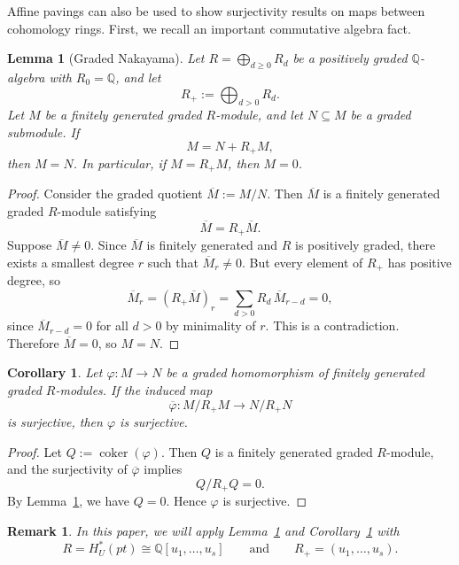 \documentclass[11pt]{amsart}
\numberwithin{equation}{section}
\newtheorem{corollary}[theorem]{Corollary}
\newtheorem{lemma}[theorem]{Lemma}
\newtheorem{remark}[theorem]{Remark}
\theoremstyle{definition}
\newcommand{\QQ}{{\mathbb{Q}}}
\begin{document}
Affine pavings can also be used to show surjectivity results on maps between
cohomology rings. First, we recall an important commutative algebra fact.

\begin{lemma}[Graded Nakayama]\label{lem: graded-nakayama}
    Let $R = \bigoplus_{d \geq 0} R_d$ be a positively graded $\QQ$-algebra
    with $R_0 = \QQ$, and let
    \[
        R_+ := \bigoplus_{d > 0} R_d.
    \]
    Let $M$ be a finitely generated graded $R$-module, and let
    $N \subseteq M$ be a graded submodule. If
    \[
        M = N + R_+M,
    \]
    then $M = N$. In particular, if $M = R_+M$, then $M = 0$.
\end{lemma}

\begin{proof}
    Consider the graded quotient $\overline{M} := M/N$. Then $\overline{M}$ is
    a finitely generated graded $R$-module satisfying
    \[
        \overline{M} = R_+\overline{M}.
    \]
    Suppose $\overline{M} \neq 0$. Since $\overline{M}$ is finitely generated
    and $R$ is positively graded, there exists a smallest degree $r$ such that
    $\overline{M}_r \neq 0$. But every element of $R_+$ has positive degree, so
    \[
        \overline{M}_r = (R_+\overline{M})_r
        = \sum_{d>0} R_d\,\overline{M}_{r-d} = 0,
    \]
    since $\overline{M}_{r-d} = 0$ for all $d>0$ by minimality of $r$.
    This is a contradiction. Therefore $\overline{M} = 0$, so $M = N$.
\end{proof}

\begin{corollary}\label{cor: graded-nakayama-surj}
    Let $\varphi: M \to N$ be a graded homomorphism of finitely generated
    graded $R$-modules. If the induced map
    \[
        \overline{\varphi}: M/R_+M \longrightarrow N/R_+N
    \]
    is surjective, then $\varphi$ is surjective.
\end{corollary}

\begin{proof}
    Let $Q := \operatorname{coker}(\varphi)$. Then $Q$ is a finitely generated
    graded $R$-module, and the surjectivity of $\overline{\varphi}$ implies
    \[
        Q/R_+Q = 0.
    \]
    By Lemma~\ref{lem: graded-nakayama}, we have $Q = 0$. Hence $\varphi$ is
    surjective.
\end{proof}

\begin{remark}\label{rem: graded-nakayama-application}
    In this paper, we will apply Lemma~\ref{lem: graded-nakayama} and
    Corollary~\ref{cor: graded-nakayama-surj} with
    \[
        R = H_U^*(pt) \cong \QQ[u_1,\dots,u_s]
        \qquad\text{and}\qquad
        R_+ = (u_1,\dots,u_s).
    \]
\end{remark}
\end{document}
